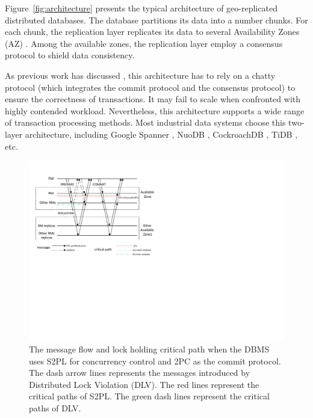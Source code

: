 \documentclass[conference]{IEEEtran}
\begin{document}
Figure~\ref{fig:architecture} presents the typical architecture of geo-replicated distributed databases.
The database partitions its data into a number chunks.
For each chunk, the replication layer replicates its data to several Availability Zones (AZ) \cite{Aurora:conf/sigmod/VerbitskiGSCGBM18}.
Among the available zones, the replication layer employ a consensus protocol to shield data consistency.

As previous work has discussed \cite{Calvin:conf/sigmod/ThomsonDWRSA12}\cite{Tapir:conf/sosp/ZhangSSKP15}\cite{Janus:conf/osdi/MuNLL16},
this architecture has to rely on a chatty protocol (which integrates the commit protocol and the consensus protocol) to ensure the correctness of transactions.
It may fail to scale when confronted with highly contended workload.
Nevertheless, this architecture supports a wide range of transaction processing methods.
Most industrial data systems choose this two-layer architecture, including Google Spanner \cite{Spanner:conf/osdi/CorbettDEFFFGGHHHKKLLMMNQRRSSTWW12}\cite{Spanner:conf/sigmod/BaconBBCDFFGJKL17},
NuoDB \cite{NuoDB}, CockroachDB \cite{CockroachDB}, TiDB \cite{TiDB}, etc.

\begin{figure}[htbp]
  \centerline{\includegraphics[scale=0.62]{figure/message_flow.pdf}}
  \caption{The message flow and lock holding critical path when the DBMS uses S2PL for concurrency control and 2PC as the commit protocol.
The dash arrow lines represents the messages introduced by Distributed Lock Violation (DLV). The red lines represent the critical paths of S2PL.
The green dash lines represent the critical paths of DLV.}
  \label{fig:two_layers_architecture}
\end{figure}
\end{document}
